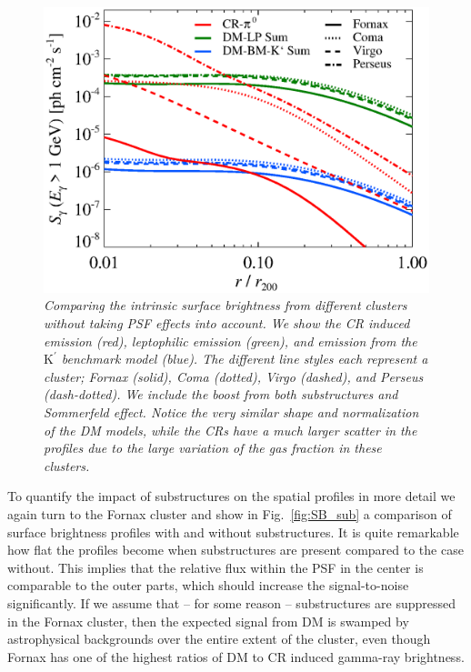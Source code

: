 \documentclass[10pt,aps,pra,reprint,amsmath,amsfonts,amssymb,showpacs,nofootinbib,floatfix]{revtex4-1}
\newcommand{\rmn}{\mathrm}
\newcommand{\Kp}{\rmn{K}^\prime}
\begin{document}
\begin{figure}
 \includegraphics[width=0.99\columnwidth]{figures/SB.v14.1GeV.SF700.SubMass.elmu.eps}
 \caption{\it Comparing the intrinsic surface brightness from
   different clusters without taking PSF effects into account. We show
   the CR induced emission (red), leptophilic emission (green), and
   emission from the $\Kp$ benchmark model (blue). The different line
   styles each represent a cluster; Fornax (solid), Coma (dotted),
   Virgo (dashed), and Perseus (dash-dotted). We include the boost
   from both substructures and Sommerfeld effect. Notice the very
   similar shape and normalization of the DM models, while the CRs
   have a much larger scatter in the profiles due to the large
   variation of the gas fraction in these clusters.}
 \label{fig:SB_clu}
\end{figure}

To quantify the impact of substructures on the spatial profiles in
more detail we again turn to the Fornax cluster and show in
Fig.~\ref{fig:SB_sub} a comparison of surface brightness profiles with
and without substructures. It is quite remarkable how flat the
profiles become when substructures are present compared to the case
without. This implies that the relative flux within the PSF in the
center is comparable to the outer parts, which should increase the
signal-to-noise significantly. If we assume that -- for
some reason -- substructures are suppressed in the Fornax cluster, then the expected
signal from DM is swamped by astrophysical backgrounds over the entire
extent of the cluster, even though Fornax has one of the highest
ratios of DM to CR induced gamma-ray brightness.
\end{document}
